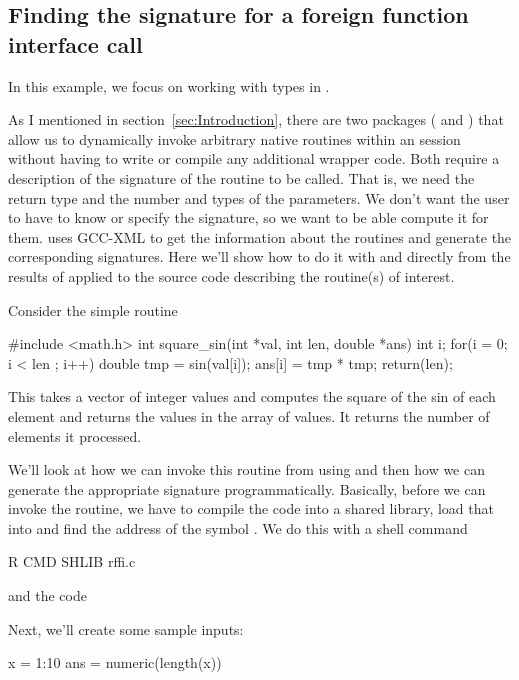 \subsection{Finding the signature for a foreign function interface call}\label{sec:RffiEG}

In this example, we focus on working with types in .

As I mentioned in section~\ref{sec:Introduction}, there are two
packages ( and ) that allow us to
dynamically invoke arbitrary native routines within an \R{} session
without having to write or compile any additional wrapper code.  Both
require a description of the signature of the routine to be
called. That is, we need the return type and the number and types of
the parameters.  We don't want the user to have to know or specify the
signature, so we want to be able compute it for them.  
uses GCC-XML to get the information about the routines and generate
the corresponding signatures.  Here we'll show how to do it with
 and directly from the results of 
applied to the source code describing the routine(s) of interest.

Consider the simple  routine
\begin{CCode}
#include <math.h>
int
square_sin(int *val, int len, double *ans)
{
    int i;
    for(i = 0; i < len ; i++) {
	double tmp = sin(val[i]);
	ans[i] = tmp * tmp;
    }
    return(len);
}
\end{CCode}
This takes a vector of integer values and computes the
square of the sin of each element and returns the values
in the array of  values. It returns the number
of elements it processed.

We'll look at how we can invoke this routine from \R{} using
 and then how we can generate the appropriate signature
programmatically.  Basically, before we can invoke the routine, we
have to compile the \C{} code into a shared
library, load that into \R{} and find the address of the symbol
.  We do this with a shell command
\begin{ShCode}
R CMD SHLIB rffi.c
\end{ShCode}
and the \R{} code

Next, we'll create some sample inputs:
\begin{RCode}
x = 1:10
ans = numeric(length(x))
\end{RCode}

